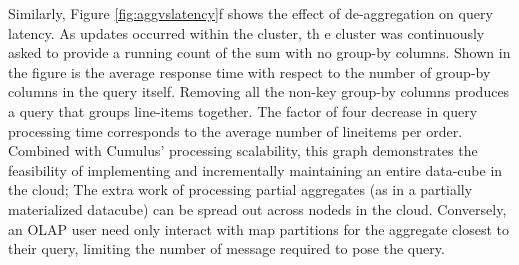 Similarly, Figure \ref{fig:aggvslatency}f shows the effect of de-aggregation on query latency.  As updates occurred within the cluster, th e cluster was continuously asked to provide a running count of the sum with no group-by columns.  Shown in the figure is the average response time with respect to the number of group-by columns in the query itself.  Removing all the non-key group-by columns produces a query that groups line-items together.  The factor of four decrease in query processing time corresponds to the average number of lineitems per order.  Combined with Cumulus' processing scalability, this graph demonstrates the feasibility of implementing and incrementally maintaining an entire data-cube in the cloud; The extra work of processing partial aggregates (as in a partially materialized datacube) can be spread out across nodeds in the cloud.  Conversely, an OLAP user need only interact with map partitions for the aggregate closest to their query, limiting the number of message required to pose the query.

